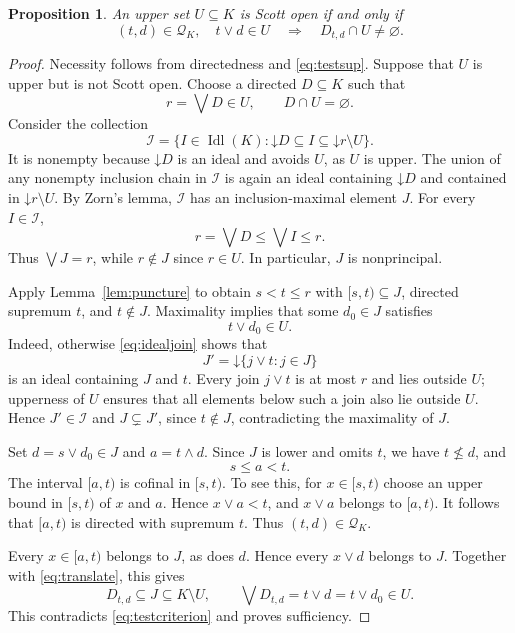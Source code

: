 \documentclass[preprint,11pt]{elsarticle}
\newtheorem{proposition}[theorem]{Proposition}
\theoremstyle{definition}
\theoremstyle{remark}
\numberwithin{equation}{section}
\newcommand{\down}[1]{\mathord{\downarrow}#1}
\newcommand{\mc}{\wedge}
\newcommand{\jc}{\vee}
\newcommand{\Idl}{\operatorname{Idl}}
\begin{document}
\begin{proposition}\label{prop:tests}
An upper set $U\subseteq K$ is Scott open if and only if
\begin{equation}\label{eq:testcriterion}
 (t,d)\in\mathcal Q_K,\quad t\jc d\in U
 \quad\Longrightarrow\quad D_{t,d}\cap U\ne\varnothing.
\end{equation}
\end{proposition}
\begin{proof}
Necessity follows from directedness and \eqref{eq:testsup}. Suppose that $U$ is upper but is not Scott open. Choose a directed $D\subseteq K$ such that
\[
 r=\bigvee D\in U,\qquad D\cap U=\varnothing.
\]
Consider the collection
\[
 \mathcal I=\{I\in\Idl(K):\down D\subseteq I\subseteq\down r\setminus U\}.
\]
It is nonempty because $\down D$ is an ideal and avoids $U$, as $U$ is upper. The union of any nonempty inclusion chain in $\mathcal I$ is again an ideal containing $\down D$ and contained in $\down r\setminus U$. By Zorn's lemma, $\mathcal I$ has an inclusion-maximal element $J$. For every $I\in\mathcal I$,
\[
 r=\bigvee D\le\bigvee I\le r.
\]
Thus $\bigvee J=r$, while $r\notin J$ since $r\in U$. In particular, $J$ is nonprincipal.

Apply Lemma~\ref{lem:puncture} to obtain $s<t\le r$ with $[s,t)\subseteq J$, directed supremum $t$, and $t\notin J$. Maximality implies that some $d_0\in J$ satisfies
\begin{equation}\label{eq:translate}
 t\jc d_0\in U.
\end{equation}
Indeed, otherwise \eqref{eq:idealjoin} shows that
\[
 J'=\down\{j\jc t:j\in J\}
\]
is an ideal containing $J$ and $t$. Every join $j\jc t$ is at most $r$ and lies outside $U$; upperness of $U$ ensures that all elements below such a join also lie outside $U$. Hence $J'\in\mathcal I$ and $J\subsetneq J'$, since $t\notin J$, contradicting the maximality of $J$.

Set $d=s\jc d_0\in J$ and $a=t\mc d$. Since $J$ is lower and omits $t$, we have $t\nleq d$, and
\[
 s\le a<t.
\]
The interval $[a,t)$ is cofinal in $[s,t)$. To see this, for $x\in[s,t)$ choose an upper bound in $[s,t)$ of $x$ and $a$. Hence $x\jc a<t$, and $x\jc a$ belongs to $[a,t)$. It follows that $[a,t)$ is directed with supremum $t$. Thus $(t,d)\in\mathcal Q_K$.

Every $x\in[a,t)$ belongs to $J$, as does $d$. Hence every $x\jc d$ belongs to $J$. Together with \eqref{eq:translate}, this gives
\[
 D_{t,d}\subseteq J\subseteq K\setminus U,
 \qquad \bigvee D_{t,d}=t\jc d=t\jc d_0\in U.
\]
This contradicts \eqref{eq:testcriterion} and proves sufficiency.
\end{proof}
\end{document}
